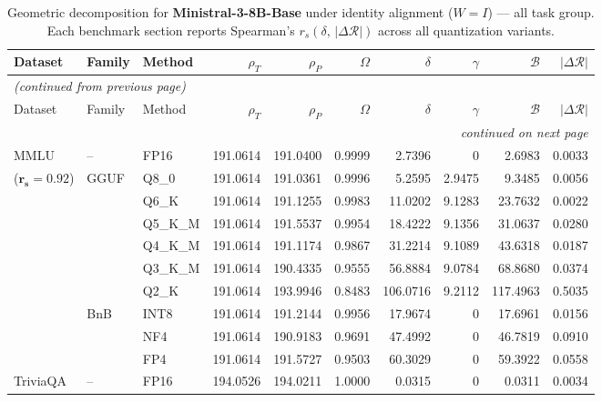\begingroup
\small
\setlength{\tabcolsep}{4pt}
\renewcommand{\arraystretch}{1.05}
\begin{longtable}{ll l rrrrrrr}
\caption{Geometric decomposition for \textbf{Ministral-3-8B-Base} under identity alignment ($W{=}I$) --- all task group. Each benchmark section reports Spearman's $r_s(\delta,\,|\Delta\mathcal{R}|)$ across all quantization variants.}\label{tab:mistral_decomposition_all}\\
\toprule
Dataset & Family & Method & $\rho_T$ & $\rho_P$ & $\Omega$ & $\delta$ & $\gamma$ & $\mathcal{B}$ & $|\Delta\mathcal{R}|$ \\
\midrule
\endfirsthead
\multicolumn{10}{l}{\small\itshape (continued from previous page)}\\
\toprule
Dataset & Family & Method & $\rho_T$ & $\rho_P$ & $\Omega$ & $\delta$ & $\gamma$ & $\mathcal{B}$ & $|\Delta\mathcal{R}|$ \\
\midrule
\endhead
\midrule
\multicolumn{10}{r}{\small\itshape continued on next page}\\
\endfoot
\bottomrule
\endlastfoot
MMLU & -- & FP16 & 191.0614 & 191.0400 & 0.9999 & 2.7396 & \cellcolor{cyan!12} $0$ & 2.6983 & 0.0033 \\
{\small ($\mathbf{r_s{=}0.92}$)} & GGUF & Q8\_0 & 191.0614 & 191.0361 & 0.9996 & 5.2595 & 2.9475 & 9.3485 & 0.0056 \\
 &  & Q6\_K & 191.0614 & 191.1255 & 0.9983 & 11.0202 & 9.1283 & 23.7632 & 0.0022 \\
 &  & Q5\_K\_M & 191.0614 & 191.5537 & 0.9954 & 18.4222 & 9.1356 & 31.0637 & 0.0280 \\
 &  & Q4\_K\_M & 191.0614 & 191.1174 & 0.9867 & 31.2214 & 9.1089 & 43.6318 & 0.0187 \\
 &  & Q3\_K\_M & 191.0614 & 190.4335 & 0.9555 & 56.8884 & 9.0784 & 68.8680 & 0.0374 \\
 &  & Q2\_K & 191.0614 & 193.9946 & \cellcolor{red!18} 0.8483 & \cellcolor{red!18} 106.0716 & 9.2112 & \cellcolor{red!18} 117.4963 & \cellcolor{red!18} 0.5035 \\
 & BnB & INT8 & 191.0614 & 191.2144 & 0.9956 & 17.9674 & \cellcolor{cyan!12} $0$ & 17.6961 & 0.0156 \\
 &  & NF4 & 191.0614 & 190.9183 & 0.9691 & 47.4992 & \cellcolor{cyan!12} $0$ & 46.7819 & 0.0910 \\
 &  & FP4 & 191.0614 & 191.5727 & 0.9503 & 60.3029 & \cellcolor{cyan!12} $0$ & 59.3922 & 0.0558 \\
\midrule
TriviaQA & -- & FP16 & 194.0526 & 194.0211 & 1.0000 & 0.0315 & \cellcolor{cyan!12} $0$ & 0.0311 & 0.0034 \\

\end{longtable}
